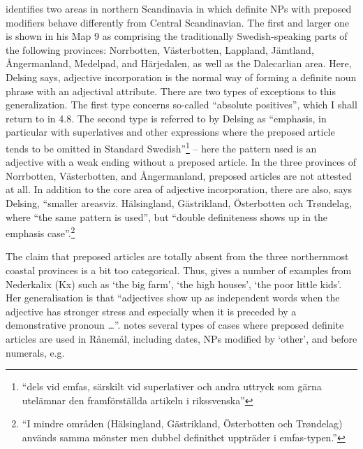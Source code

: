 \citet[49]{Delsing2003a} identifies two areas in northern Scandinavia in which definite NPs with preposed modifiers behave differently from Central Scandinavian. The first and larger one is shown in his Map 9 as comprising the traditionally Swedish-speaking parts of the following provinces: Norrbotten, Västerbotten, Lappland, Jämtland, Ångermanland, Medelpad, and Härjedalen, as well as the Dalecarlian area. Here, Delsing says, adjective incorporation is the normal way of forming a definite noun phrase with an adjectival attribute. There are two types of exceptions to this generalization. The first type concerns so-called “absolute positives”, which I shall return to in 4.8. The second type is referred to by Delsing as “emphasis, in particular with superlatives and other expressions where the preposed article tends to be omitted in Standard Swedish”\footnote{ “dels vid emfas, särskilt vid superlativer och andra uttryck som gärna utelämnar den framförställda artikeln i rikssvenska” } – here the pattern used is an adjective with a weak ending without a preposed article. In the three provinces of Norrbotten, Västerbotten, and Ångermanland, preposed articles are not attested at all. In addition to the core area of adjective incorporation, there are also, says Delsing, “smaller areasviz. Hälsingland, Gästrikland, Österbotten och Trøndelag, where “the same pattern is used”, but “double definiteness shows up in the emphasis case”.\footnote{ “I mindre områden (Hälsingland, Gästrikland, Österbotten och Trøndelag) används samma mönster men dubbel definithet uppträder i emfas-typen.”}


The claim that preposed articles are totally absent from the three northernmost coastal provinces is a bit too categorical. Thus, \citet[141]{Rutberg1924} gives a number of examples from Nederkalix (Kx) such as ‘the big farm’, ‘the high houses’, ‘the poor little kids’. Her generalisation is that “adjectives show up as independent words when the adjective has stronger stress and especially when it is preceded by a demonstrative pronoun …”. \citet[114]{Wikberg2004} notes several types of cases where preposed definite articles are used in Rånemål, including dates, NPs modified by  ‘other’, and before numerals, e.g.

